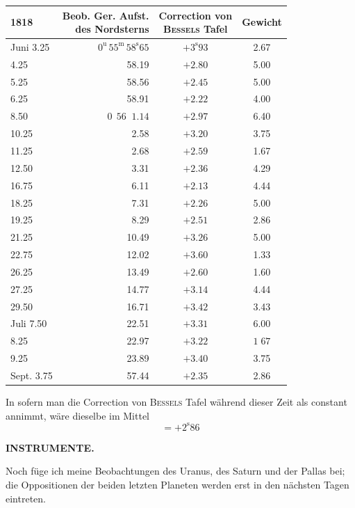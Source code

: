 \begin{center}
\begin{tabular}{l|r|c|c}
1818 & \shortstack{Beob. Ger. Aufst.\\des Nordsterns} & \shortstack{Correction von\\\textsc{Bessels} Tafel} & Gewicht \\
\hline
Juni 3.25 & $0^{\mathrm u}\,55^{\mathrm m}\,58^{\mathrm s}65$ & $+3^{\mathrm s}93$ & 2.67 \\
4.25 & 58.19 & $+2.80$ & 5.00 \\
5.25 & 58.56 & $+2.45$ & 5.00 \\
6.25 & 58.91 & $+2.22$ & 4.00 \\
8.50 & $0\,\;56\;\;1.14$ & $+2.97$ & 6.40 \\
10.25 & 2.58 & $+3.20$ & 3.75 \\
11.25 & 2.68 & $+2.59$ & 1.67 \\
12.50 & 3.31 & $+2.36$ & 4.29 \\
16.75 & 6.11 & $+2.13$ & 4.44 \\
18.25 & 7.31 & $+2.26$ & 5.00 \\
19.25 & 8.29 & $+2.51$ & 2.86 \\
21.25 & 10.49 & $+3.26$ & 5.00 \\
22.75 & 12.02 & $+3.60$ & 1.33 \\
26.25 & 13.49 & $+2.60$ & 1.60 \\
27.25 & 14.77 & $+3.14$ & 4.44 \\
29.50 & 16.71 & $+3.42$ & 3.43 \\
Juli 7.50 & 22.51 & $+3.31$ & 6.00 \\
8.25 & 22.97 & $+3.22$ & $1\;67$ \\
9.25 & 23.89 & $+3.40$ & 3.75 \\
Sept. 3.75 & 57.44 & $+2.35$ & 2.86 \\
\end{tabular}
\end{center}

\par\indent In sofern man die Correction von \textsc{Bessels} Tafel während dieser Zeit als constant annimmt, wäre dieselbe im Mittel
\[
= +2^{\mathrm s}86
\]

\clearpage
\thispagestyle{empty}
\noindent{}%
%
\parbox[t]{\dimexpr\linewidth-24mm\relax}{\centering\footnotesize\bfseries INSTRUMENTE.\par}%
\makebox[12mm][r]{}\par\nobreak\medskip
\par\indent Noch füge ich meine Beobachtungen des Uranus, des Saturn und der Pallas bei; die Oppositionen der beiden letzten Planeten werden erst in den nächsten Tagen eintreten.

